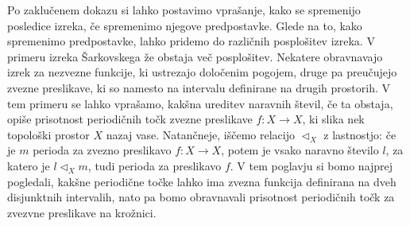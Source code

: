 \documentclass[../TG_magistrsko_delo_sections.tex]{subfiles}
\begin{document}
Po zaklučenem dokazu si lahko postavimo vprašanje, kako se spremenijo posledice izreka, če spremenimo njegove predpostavke. Glede na to, kako spremenimo predpostavke, lahko pridemo do različnih posplošitev izreka. V primeru izreka Šarkovskega že obstaja več posplošitev. Nekatere obravnavajo izrek za nezvezne funkcije, ki ustrezajo določenim pogojem, druge pa preučujejo zvezne preslikave, ki so namesto na intervalu definirane na drugih prostorih. V tem primeru se lahko vprašamo, kakšna ureditev naravnih števil, če ta obstaja, opiše prisotnost periodičnih točk zvezne preslikave $f\colon X \to X$, ki slika nek topološki prostor $X$ nazaj vase.  Natančneje, iščemo relacijo $\triangleleft_X$ z lastnostjo: če je $m$ perioda za zvezno preslikavo $f \colon X \to X$, potem je vsako naravno število $l$, za katero je $l \triangleleft_X m$, tudi perioda za preslikavo $f$.
V tem poglavju si bomo najprej pogledali, kakšne periodične točke lahko ima zvezna funkcija definirana na dveh disjunktnih intervalih, nato pa bomo obravnavali prisotnost periodičnih točk za zvezvne preslikave na krožnici.

\end{document}

